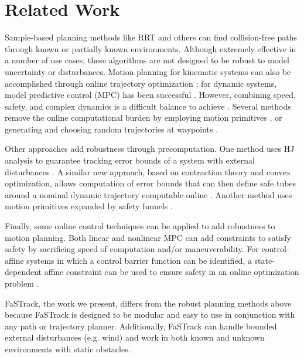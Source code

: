 \section{Related Work \label{sec:relatedwork}}
Sample-based planning methods like RRT \cite{Kuffner2000} and others \cite{Kavraki1996,Janson2015,Richter2016, Karaman2011, Kobilarov2012} can find collision-free paths through known or partially known environments. Although extremely effective in a number of use cases, these algorithms are not designed to be robust to model uncertainty or disturbances. Motion planning for kinematic systems can also be accomplished through online trajectory optimization \cite{Schulman2013,Ratliff2009}; for dynamic systems, model predictive control (MPC) has been successful \cite{Qin2003}. However, combining speed, safety, and complex dynamics is a difficult balance to achieve \cite{Vitus2008, Zeilinger2011, Richter2012}. Several methods remove the online computational burden by employing motion primitives \cite{Gillula2010, Dey2016}, or generating and choosing random trajectories at waypoints \cite{Kalakrishnan2011, Schwesinger2013}. 


Other approaches add robustness through precomputation. One method uses HJ analysis to guarantee tracking error bounds of a system with external disturbances \cite{Bansal2017}. A similar new approach, based on contraction theory and convex optimization, allows computation of error bounds that can then define safe tubes around a nominal dynamic trajectory computable online \cite{Singh2017}.  Another method uses motion primitives expanded by safety funnels \cite{Majumdar2017}.

Finally, some online control techniques can be applied to add robustness to motion planning. Both linear and nonlinear MPC can add constraints to satisfy safety \cite{Richards2006, DiCairano2016,Hoy2015} by sacrificing speed of computation and/or maneuverability. For control-affine systems in which a control barrier function can be identified, a state-dependent affine constraint can be used to ensure safety in an online optimization problem \cite{Ames2014}.

FaSTrack, the work we present, differs from the robust planning methods above because FaSTrack is designed to be modular and easy to use in conjunction with any path or trajectory planner. Additionally, FaSTrack can handle bounded external disturbances (e.g. wind) and work in both known and unknown environments with static obstacles.